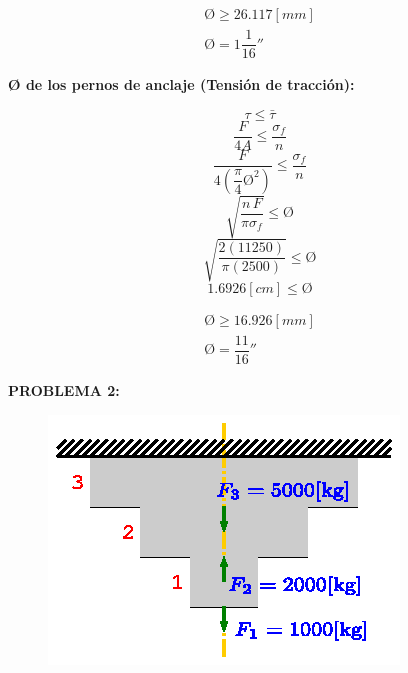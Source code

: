 \documentclass[letter,10pt,twoside]{article}
\begin{document}
\begin{equation*}
\boxed{
    \begin{array}{l}
        \text{\O} \ge 26.117[mm] \\
        \text{\O} = 1\dfrac{1}{16}''
    \end{array}
}
\end{equation*}

\textbf{{\O} de los pernos de anclaje (Tensión de tracción):}

\begin{equation*}
    \tau \le \bar{\tau}
\end{equation*}
\begin{equation*}
    \frac{F}{4A} \le \frac{\sigma_f}{n}
\end{equation*}
\begin{equation*}
    \frac{F}{4(\dfrac{\pi}{4} \text{\O}^2)} \le \frac{\sigma_f}{n}
\end{equation*}
\begin{equation*}
    \sqrt{\frac{n\,F}{\pi\sigma_f}} \le \text{\O}
\end{equation*}
\begin{equation*}
    \sqrt{\frac{2(11250)}{\pi(2500)}} \le \text{\O}
\end{equation*}
\begin{equation*}
    1.6926[cm] \le \text{\O}
\end{equation*}

\begin{equation*}
\boxed{
    \begin{array}{l}
        \text{\O} \ge 16.926[mm] \\
        \text{\O} = \dfrac{11}{16}''
    \end{array}
}
\end{equation*}

\newpage

\colorbox{blue!25}{\textbf{PROBLEMA 2:}}

\begin{figure}[H]
\centering
\includegraphics[scale=1.6]{resources/f02.eps}
\end{figure}
\end{document}
